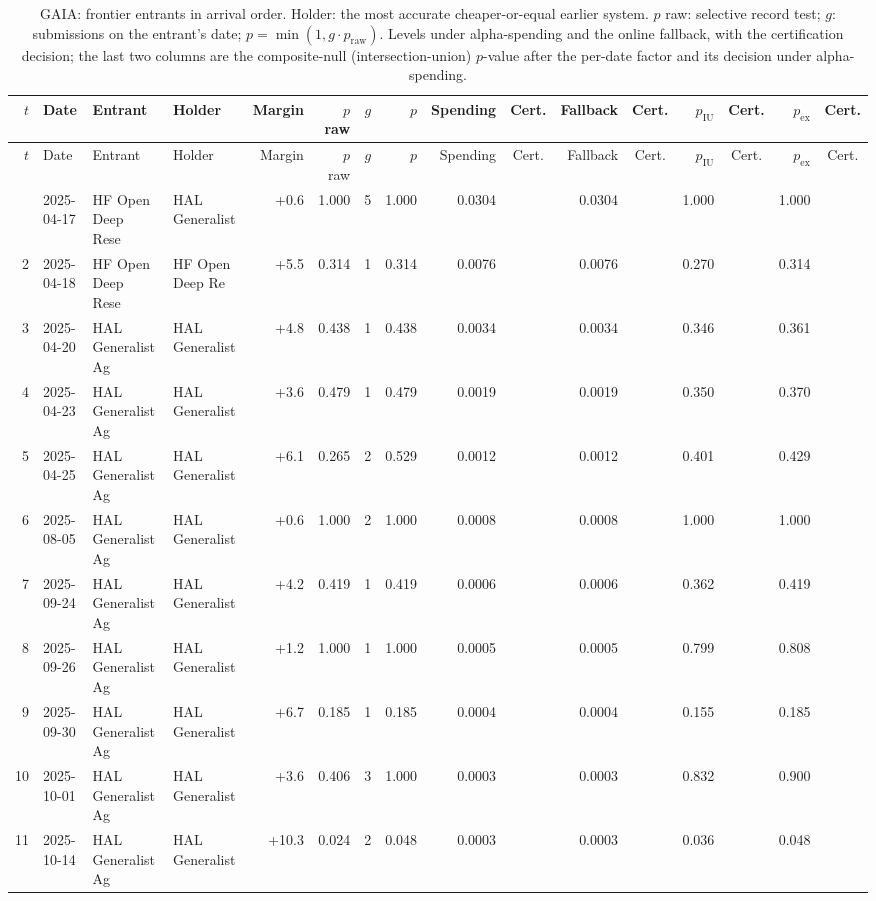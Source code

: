 {\begin{longtable}{rlllrrrrrcrcrcrc}
\caption{GAIA: frontier entrants in arrival order. Holder: the most accurate cheaper-or-equal earlier system. $p$ raw: selective record test; $g$: submissions on the entrant's date; $p = \min(1, g \cdot p_{\mathrm{raw}})$. Levels under alpha-spending and the online fallback, with the certification decision; the last two columns are the composite-null (intersection-union) $p$-value after the per-date factor and its decision under alpha-spending.}\label{tab:supp-cert-hal_gaia}\\
\toprule
$t$ & Date & Entrant & Holder & Margin & $p$ raw & $g$ & $p$ & Spending & Cert. & Fallback & Cert. & $p_{\mathrm{IU}}$ & Cert. & $p_{\mathrm{ex}}$ & Cert. \\
\midrule
\endfirsthead
\toprule
$t$ & Date & Entrant & Holder & Margin & $p$ raw & $g$ & $p$ & Spending & Cert. & Fallback & Cert. & $p_{\mathrm{IU}}$ & Cert. & $p_{\mathrm{ex}}$ & Cert. \\
\midrule
\endhead
\bottomrule
\endfoot
1 & 2025-04-17 & HF Open Deep Rese~ & HAL Generalist ~ & +0.6 & 1.000 & 5 & 1.000 & 0.0304 &  & 0.0304 &  & 1.000 &  & 1.000 &  \\
2 & 2025-04-18 & HF Open Deep Rese~ & HF Open Deep Re~ & +5.5 & 0.314 & 1 & 0.314 & 0.0076 &  & 0.0076 &  & 0.270 &  & 0.314 &  \\
3 & 2025-04-20 & HAL Generalist Ag~ & HAL Generalist ~ & +4.8 & 0.438 & 1 & 0.438 & 0.0034 &  & 0.0034 &  & 0.346 &  & 0.361 &  \\
4 & 2025-04-23 & HAL Generalist Ag~ & HAL Generalist ~ & +3.6 & 0.479 & 1 & 0.479 & 0.0019 &  & 0.0019 &  & 0.350 &  & 0.370 &  \\
5 & 2025-04-25 & HAL Generalist Ag~ & HAL Generalist ~ & +6.1 & 0.265 & 2 & 0.529 & 0.0012 &  & 0.0012 &  & 0.401 &  & 0.429 &  \\
6 & 2025-08-05 & HAL Generalist Ag~ & HAL Generalist ~ & +0.6 & 1.000 & 2 & 1.000 & 0.0008 &  & 0.0008 &  & 1.000 &  & 1.000 &  \\
7 & 2025-09-24 & HAL Generalist Ag~ & HAL Generalist ~ & +4.2 & 0.419 & 1 & 0.419 & 0.0006 &  & 0.0006 &  & 0.362 &  & 0.419 &  \\
8 & 2025-09-26 & HAL Generalist Ag~ & HAL Generalist ~ & +1.2 & 1.000 & 1 & 1.000 & 0.0005 &  & 0.0005 &  & 0.799 &  & 0.808 &  \\
9 & 2025-09-30 & HAL Generalist Ag~ & HAL Generalist ~ & +6.7 & 0.185 & 1 & 0.185 & 0.0004 &  & 0.0004 &  & 0.155 &  & 0.185 &  \\
10 & 2025-10-01 & HAL Generalist Ag~ & HAL Generalist ~ & +3.6 & 0.406 & 3 & 1.000 & 0.0003 &  & 0.0003 &  & 0.832 &  & 0.900 &  \\
11 & 2025-10-14 & HAL Generalist Ag~ & HAL Generalist ~ & +10.3 & 0.024 & 2 & 0.048 & 0.0003 &  & 0.0003 &  & 0.036 &  & 0.048 &  \\
\end{longtable}

}
